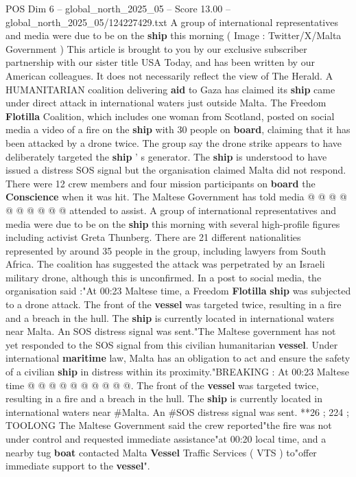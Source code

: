 \begin{textsample}{POS Dim 6 – global\_north\_2025\_05 – Score 13.00 – global\_north\_2025\_05/124227429.txt}  \label{ex:f6_pos_063}
A group of international representatives and media were due to be on the \textbf{ship} this morning ( Image : Twitter/X/Malta Government ) This article is brought to you by our exclusive subscriber partnership with our sister title USA Today, and has been written by our American colleagues.
It does not necessarily reflect the view of The Herald.
A HUMANITARIAN coalition delivering \textbf{aid} to Gaza has claimed its \textbf{ship} came under direct attack in international waters just outside Malta.
The Freedom \textbf{Flotilla} Coalition, which includes one woman from Scotland, posted on social media a video of a fire on the \textbf{ship} with 30 people on \textbf{board}, claiming that it has been attacked by a drone twice.
The group say the drone strike appears to have deliberately targeted the \textbf{ship} ' s generator.
The \textbf{ship} is understood to have issued a distress SOS signal but the organisation claimed Malta did not respond.
There were 12 crew members and four mission participants on \textbf{board} the \textbf{Conscience} when it was hit.
The Maltese Government has told media @ @ @ @ @ @ @ @ @ @ attended to assist.
A group of international representatives and media were due to be on the \textbf{ship} this morning with several high-profile figures including activist Greta Thunberg.
There are 21 different nationalities represented by around 35 people in the group, including lawyers from South Africa.
The coalition has suggested the attack was perpetrated by an Israeli military drone, although this is unconfirmed.
In a post to social media, the organisation said :"At 00:23 Maltese time, a Freedom \textbf{Flotilla} \textbf{ship} was subjected to a drone attack.
The front of the \textbf{vessel} was targeted twice, resulting in a fire and a breach in the hull.
The \textbf{ship} is currently located in international waters near Malta.
An SOS distress signal was sent."The Maltese government has not yet responded to the SOS signal from this civilian humanitarian \textbf{vessel}.
Under international \textbf{maritime} law, Malta has an obligation to act and ensure the safety of a civilian \textbf{ship} in distress within its proximity."BREAKING : At 00:23 Maltese time @ @ @ @ @ @ @ @ @ @.
The front of the \textbf{vessel} was targeted twice, resulting in a fire and a breach in the hull.
The \textbf{ship} is currently located in international waters near \#Malta.
An \#SOS distress signal was sent. **26 ; 224 ; TOOLONG The Maltese Government said the crew reported"the fire was not under control and requested immediate assistance"at 00:20 local time, and a nearby tug \textbf{boat} contacted Malta \textbf{Vessel} Traffic Services ( VTS ) to"offer immediate support to the \textbf{vessel}".

\end{textsample}
